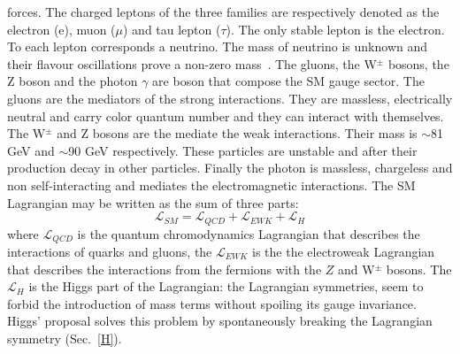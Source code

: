 forces. The charged leptons of the three families are respectively denoted as the electron
(e), muon ($\mu$) and tau lepton ($\tau$). The only stable lepton is the electron. To each lepton corresponds a neutrino. The mass of neutrino is unknown and their flavour oscillations prove a non-zero mass~\cite{Balantekin:2013tqa}. 
The gluons, the W$^{\pm}$ bosons, the Z boson and the photon $\gamma$ are boson that compose the SM gauge sector.
The gluons are the mediators of the strong interactions. They are massless, electrically neutral and carry color quantum number and they can interact with themselves.
The  W$^{\pm}$ and Z bosons are the mediate the weak interactions. Their mass is $\sim$81 GeV and $\sim$90 GeV respectively. These particles are unstable and after their production decay in other particles. Finally the photon is massless, chargeless and non self-interacting and mediates the electromagnetic
interactions.
The SM Lagrangian may be written as the sum of three parts:
\begin{equation}
 \mathcal{L}_{SM} = \mathcal{L}_{QCD}+\mathcal{L}_{EWK}+\mathcal{L}_{H}    \end{equation}
where $\mathcal{L}_{QCD}$ is the quantum chromodynamics Lagrangian that describes the interactions of quarks and gluons, the $\mathcal{L}_{EWK}$ is the the electroweak Lagrangian that describes the interactions from the fermions with the $Z$ and  W$^{\pm}$ bosons. The $\mathcal{L}_{H}$ is the Higgs part of the Lagrangian: the Lagrangian symmetries, seem to forbid the introduction of mass terms without spoiling its gauge invariance. Higgs’ proposal solves this problem by spontaneously breaking the Lagrangian symmetry (Sec.~\ref{H}).


